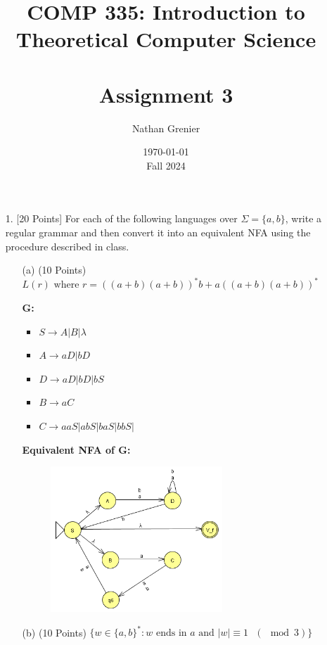 \documentclass[12pt]{article}
\title{COMP 335: Introduction to Theoretical Computer Science\\
\ \\
Assignment 3}
\author{Nathan Grenier}
\date{\today \\ Fall 2024}
\begin{document}
\begin{spacing}{1.5}
      \maketitle

      \newpage

      \begin{enumerate}

            \item[1.] [20 Points] For each of the following languages over $\Sigma = \{a,b\}$, write a regular grammar and then convert it into an equivalent NFA using the procedure described in class.

                  \begin{enumerate}
                        \item[(a)] (10 Points) $L(r) \text{ where } r= ((a+b)(a+b))^*b+a((a+b)(a+b))^*$

                              \textbf{G:}
                              \begin{itemize}
                                    \item $S \rightarrow A|B|\lambda$
                                    \item $A \rightarrow aD|bD$
                                    \item $D \rightarrow aD|bD|bS$
                                    \item $B \rightarrow aC$
                                    \item $C \rightarrow aaS|abS|baS|bbS|$
                              \end{itemize}

                              \textbf{Equivalent NFA of G:}

                              \begin{figure}[h!]
                                    \centering
                                    \includegraphics[width=0.65\textwidth]{img/q1/q1a(NFA).png}
                              \end{figure}
                              \newpage
                        \item[(b)] (10 Points) $\{w \in \{a,b\}^* : w \text{ ends in $a$ and $|w| \equiv 1$ } (\mod 3) \}$


\end{enumerate}
\end{enumerate}
\end{spacing}
\end{document}
